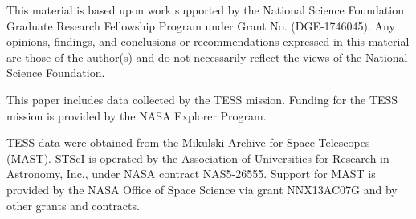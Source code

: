 \documentclass[twocolumn]{aastex63}
\begin{document}
This material is based upon work supported by the National Science Foundation Graduate Research Fellowship Program under Grant No. (DGE-1746045). Any opinions, findings, and conclusions or recommendations expressed in this material are those of the author(s) and do not necessarily reflect the views of the National Science Foundation.



This paper includes data collected by the TESS mission. Funding for the TESS mission is provided by the NASA Explorer Program.

TESS data were obtained from the Mikulski Archive for Space Telescopes
(MAST).
STScI is operated by the Association of Universities for Research in
Astronomy, Inc., under NASA contract NAS5-26555.
Support for MAST is provided by the NASA Office of Space Science via grant
NNX13AC07G and by other grants and contracts.










\end{document}
